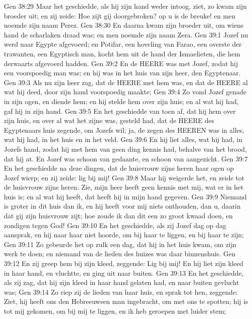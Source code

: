 Gen 38:29  Maar het geschiedde, als hij zijn hand weder intoog, ziet, zo kwam zijn broeder uit; en zij zeide: Hoe zijt gij doorgebroken? op u is de breuke! en men noemde zijn naam Perez.
Gen 38:30  En daarna kwam zijn broeder uit, om wiens hand de scharlaken draad was; en men noemde zijn naam Zera.
Gen 39:1  Jozef nu werd naar Egypte afgevoerd; en Potifar, een hoveling van Farao, een overste der trawanten, een Egyptisch man, kocht hem uit de hand der Ismaelieten, die hem derwaarts afgevoerd hadden.
Gen 39:2  En de HEERE was met Jozef, zodat hij een voorspoedig man was; en hij was in het huis van zijn heer, den Egyptenaar.
Gen 39:3  Als nu zijn heer zag, dat de HEERE met hem was, en dat de HEERE al wat hij deed, door zijn hand voorspoedig maakte;
Gen 39:4  Zo vond Jozef genade in zijn ogen, en diende hem; en hij stelde hem over zijn huis; en al wat hij had, gaf hij in zijn hand.
Gen 39:5  En het geschiedde van toen af, dat hij hem over zijn huis, en over al wat het zijne was, gesteld had, dat de HEERE des Egyptenaars huis zegende, om Jozefs wil; ja, de zegen des HEEREN was in alles, wat hij had, in het huis en in het veld.
Gen 39:6  En hij liet alles, wat hij had, in Jozefs hand, zodat hij met hem van geen ding kennis had, behalve van het brood, dat hij at. En Jozef was schoon van gedaante, en schoon van aangezicht.
Gen 39:7  En het geschiedde na deze dingen, dat de huisvrouw zijns heren haar ogen op Jozef wierp; en zij zeide: lig bij mij!
Gen 39:8  Maar hij weigerde het, en zeide tot de huisvrouw zijns heren: Zie, mijn heer heeft geen kennis met mij, wat er in het huis is; en al wat hij heeft, dat heeft hij in mijn hand gegeven.
Gen 39:9  Niemand is groter in dit huis dan ik, en hij heeft voor mij niets onthouden, dan u, daarin dat gij zijn huisvrouw zijt; hoe zoude ik dan dit een zo groot kwaad doen, en zondigen tegen God!
Gen 39:10  En het geschiedde, als zij Jozef dag op dag aansprak, en hij naar haar niet hoorde, om bij haar te liggen, en bij haar te zijn;
Gen 39:11  Zo gebeurde het op zulk een dag, dat hij in het huis kwam, om zijn werk te doen; en niemand van de lieden des huizes was daar binnenshuis.
Gen 39:12  En zij greep hem bij zijn kleed, zeggende: Lig bij mij! En hij liet zijn kleed in haar hand, en vluchtte, en ging uit naar buiten.
Gen 39:13  En het geschiedde, als zij zag, dat hij zijn kleed in haar hand gelaten had, en naar buiten gevlucht was;
Gen 39:14  Zo riep zij de lieden van haar huis, en sprak tot hen, zeggende: Ziet, hij heeft ons den Hebreeuwsen man ingebracht, om met ons te spotten; hij is tot mij gekomen, om bij mij te liggen, en ik heb geroepen met luider stem;
